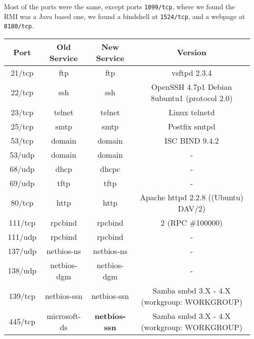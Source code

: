 \begin{enumerate}
    Most of the ports were the same, except ports \texttt{1099/tcp}, where we found the RMI was a Java based one, we found a bindshell at \texttt{1524/tcp}, and a webpage at \texttt{8180/tcp}.
    \begin{table}[!h]
        \centering
        \begin{tabular}{|c|c|c|c|}
            \hline
            \textbf{Port} & \textbf{Old Service} & \textbf{New Service} & \textbf{Version} \\ \hline
            21/tcp        & ftp                    & ftp                    & vsftpd 2.3.4 \\ \hline
            22/tcp        & ssh                    & ssh                    & OpenSSH 4.7p1 Debian 8ubuntu1 (protocol 2.0) \\ \hline
            23/tcp        & telnet                 & telnet                 & Linux telnetd \\ \hline
            25/tcp        & smtp                   & smtp                   & Postfix smtpd \\ \hline
            53/tcp        & domain                 & domain                 & ISC BIND 9.4.2 \\ \hline
            53/udp        & domain                 & domain                 & - \\ \hline
            68/udp        & dhcp                   & dhcpc                  & - \\ \hline
            69/udp        & tftp                   & tftp                   & - \\ \hline
            80/tcp        & http                   & http                   & Apache httpd 2.2.8 ((Ubuntu) DAV/2) \\ \hline
            111/tcp       & rpcbind                & rpcbind                & 2 (RPC \#100000) \\ \hline
            111/udp       & rpcbind                & rpcbind                & - \\ \hline
            137/udp       & netbios-ns             & netbios-ns             & - \\ \hline
            138/udp       & netbios-dgm            & netbios-dgm            & - \\ \hline
            139/tcp       & netbios-ssn            & netbios-ssn            & Samba smbd 3.X - 4.X (workgroup: WORKGROUP) \\ \hline
            445/tcp       & microsoft-ds           & \textbf{netbios-ssn}   & Samba smbd 3.X - 4.X (workgroup: WORKGROUP) \\ \hline

\end{tabular}
\end{table}
\end{enumerate}
